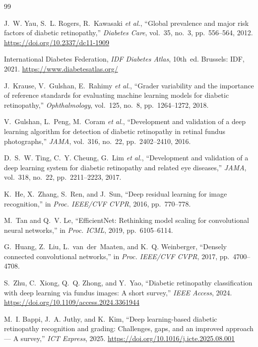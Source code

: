 \documentclass[10pt, twocolumn]{article}
\begin{document}
\begin{thebibliography}{99}

J.~W. Yau, S.~L. Rogers, R.~Kawasaki \textit{et al.}, ``Global prevalence and major risk factors of diabetic retinopathy,'' \textit{Diabetes Care}, vol.~35, no.~3, pp.~556--564, 2012. \url{https://doi.org/10.2337/dc11-1909}

International Diabetes Federation, \textit{IDF Diabetes Atlas}, 10th~ed. Brussels: IDF, 2021. \url{https://www.diabetesatlas.org/}

J.~Krause, V.~Gulshan, E.~Rahimy \textit{et al.}, ``Grader variability and the importance of reference standards for evaluating machine learning models for diabetic retinopathy,'' \textit{Ophthalmology}, vol.~125, no.~8, pp.~1264--1272, 2018.

V.~Gulshan, L.~Peng, M.~Coram \textit{et al.}, ``Development and validation of a deep learning algorithm for detection of diabetic retinopathy in retinal fundus photographs,'' \textit{JAMA}, vol.~316, no.~22, pp.~2402--2410, 2016.

D.~S.~W. Ting, C.~Y. Cheung, G.~Lim \textit{et al.}, ``Development and validation of a deep learning system for diabetic retinopathy and related eye diseases,'' \textit{JAMA}, vol.~318, no.~22, pp.~2211--2223, 2017.

K.~He, X.~Zhang, S.~Ren, and J.~Sun, ``Deep residual learning for image recognition,'' in \textit{Proc. IEEE/CVF CVPR}, 2016, pp.~770--778.

M.~Tan and Q.~V. Le, ``EfficientNet: Rethinking model scaling for convolutional neural networks,'' in \textit{Proc. ICML}, 2019, pp.~6105--6114.

G.~Huang, Z.~Liu, L.~van~der~Maaten, and K.~Q. Weinberger, ``Densely connected convolutional networks,'' in \textit{Proc. IEEE/CVF CVPR}, 2017, pp.~4700--4708.

S.~Zhu, C.~Xiong, Q.~Q. Zhong, and Y.~Yao, ``Diabetic retinopathy classification with deep learning via fundus images: A short survey,'' \textit{IEEE Access}, 2024. \url{https://doi.org/10.1109/access.2024.3361944}

M.~I. Bappi, J.~A. Juthy, and K.~Kim, ``Deep learning-based diabetic retinopathy recognition and grading: Challenges, gaps, and an improved approach --- A survey,'' \textit{ICT Express}, 2025. \url{https://doi.org/10.1016/j.icte.2025.08.001}


\end{thebibliography}
\end{document}
